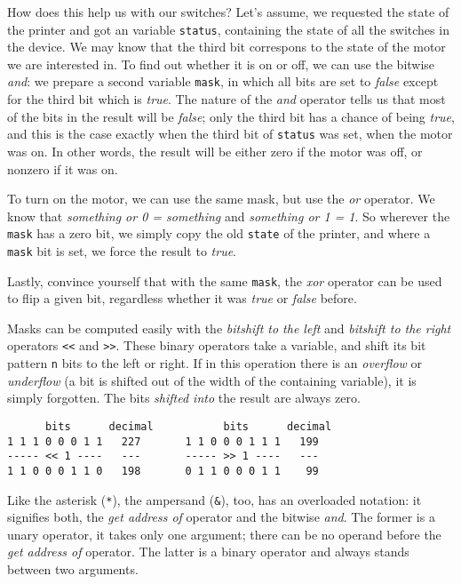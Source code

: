 {How does this help us with our switches? Let's assume, we requested the state of the printer and got an  variable \texttt{status}, containing the state of all the switches in the device. We may know that the third bit correspons to the state of the motor we are interested in. To find out whether it is on or off, we can use the bitwise \emph{and}: we prepare a second  variable \texttt{mask}, in which all bits are set to \emph{false} except for the third bit which is \emph{true}. The nature of the \emph{and} operator tells us that most of the bits in the result will be \emph{false}; only the third bit has a chance of being \emph{true}, and this is the case exactly when the third bit of \texttt{status} was set, \ie when the motor was on. In other words, the result will be either zero if the motor was off, or nonzero if it was on.

To turn on the motor, we can use the same mask, but use the \emph{or} operator. We know that \emph{something or 0 = something} and \emph{something or 1 = 1}. So wherever the \texttt{mask} has a zero bit, we simply copy the old \texttt{state} of the printer, and where a \texttt{mask} bit is set, we force the result to \emph{true}.

Lastly, convince yourself that with the same \texttt{mask}, the \emph{xor} operator can be used to flip a given bit, regardless whether it was \emph{true} or \emph{false} before.

Masks can be computed easily with the \emph{bitshift to the left} and \emph{bitshift to the right} operators \texttt{<{}<} and \texttt{>{}>}. These binary operators take a variable, and shift its bit pattern \texttt{n} bits to the left or right. If in this operation there is an \emph{overflow} or \emph{underflow} (a bit is shifted out of the width of the containing variable), it is simply forgotten. The bits \emph{shifted into} the result are always zero.

\begin{defbox}
\begin{verbatim}
      bits      decimal           bits      decimal
1 1 1 0 0 0 1 1   227       1 1 0 0 0 1 1 1   199
----- << 1 ----   ---       ----- >> 1 ----   ---
1 1 0 0 0 1 1 0   198       0 1 1 0 0 0 1 1    99
\end{verbatim}
\end{defbox}

\begin{hintbox}
Like the asterisk (\texttt{*}), the ampersand (\texttt{\&}), too, has an overloaded notation: it signifies both, the \emph{get address of} operator and the bitwise \emph{and}. The former is a unary operator, \ie it takes only one argument; there can be no operand before the \emph{get address of} operator. The latter is a binary operator and always stands between two arguments.


\end{hintbox}}
